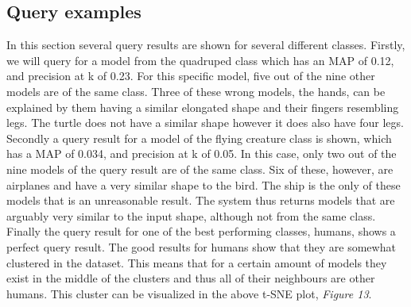 \documentclass{bigdata}
\begin{document}
\subsection{Query examples}
In this section several query results are shown for several different classes. Firstly, we will query for a model from the quadruped class which has an MAP of 0.12, and precision at k of 0.23. For this specific model, five out of the nine other models are of the same class. Three of these wrong models, the hands, can be explained by them having a similar elongated shape and their fingers resembling legs. The turtle does not have a similar shape however it does also have four legs.  \\
Secondly a query result for a model of the flying creature class is shown, which has a MAP of 0.034, and precision at k of 0.05. In this case, only two out of the nine models of the query result are of the same class. Six of these, however, are airplanes and have a very similar shape to the bird. The ship is the only of these models that is an unreasonable result. The system thus returns models that are arguably very similar to the input shape, although not from the same class. \\
Finally the query result for one of the best performing classes, humans, shows a perfect query result. The good results for humans show that they are somewhat clustered in the dataset. This means that for a certain amount of models they exist in the middle of the clusters and thus all of their neighbours are other humans. This cluster can be visualized in the above t-SNE plot, \textit{Figure 13}. \\
\end{document}
